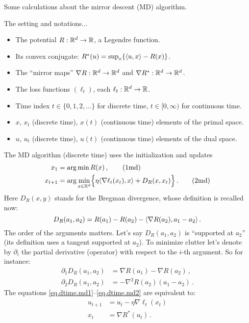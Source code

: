 \documentclass[12pt]{report}
\theoremstyle{plain}
\theoremstyle{definition}
\theoremstyle{remark}
\begin{document}

Some calculations about the mirror descent (MD) algorithm.

\bigskip

\noindent
The setting and notations...
\begin{itemize}[leftmargin=*, itemsep=2pt]
\item The potential $R : \mathbb{R}^d \to \mathbb{R}$, a Legendre function.
\item Its convex conjugate: $R^{*}(u) = \sup_{x} \{ \langle {u,x}\rangle - R(x)\}$.
\item The ``mirror maps'' $\nabla R : \mathbb{R}^d \to \mathbb{R}^d$ and $\nabla R^{*} : \mathbb{R}^d \to \mathbb{R}^d$.
\item The loss functions $(\ell_t)$, each $\ell_t : \mathbb{R}^d \to \mathbb{R}$.
\item Time index $t \in \{ 0,1,2,\ldots \}$ for discrete time, $t \in [0,\infty)$ for continuous time.
\item $x$, $x_t$ (discrete time), $x(t)$ (continuous time) elements of the primal space.
\item $u$, $u_t$ (discrete time), $u(t)$ (continuous time) elements of the dual space.
\end{itemize}
The MD algorithm (discrete time) uses the initialization and updates
\begin{align}
x_1 &= \arg\min R(x)\,, \label{eq.dtime.md1} \tag{1md} \\
x_{t+1} &= \arg\min_{x \in \mathbb{R}^d} \Bigl\{ \eta \langle {\nabla\ell_t(x_{t}), x}\rangle + D_{R}(x, x_{t})\Bigr\}\,.
 \label{eq.dtime.md2} 
\tag{2md}
\end{align}
Here $D_{R}(x,y)$ stands for the Bregman divergence, whose definition is recalled now:
\[
D_{R}(a_{1}, a_{2}) = R(a_{1}) - R(a_{2}) - \langle {\nabla R(a_2), a_{1} - a_{2}}\rangle\,.
\]
The order of the arguments matters.
Let's say $D_{R}(a_{1},a_{2})$ is ``supported at $a_{2}$''
(its definition uses a tangent supported at $a_{2}$).
To minimize clutter let's denote by $\partial_{i}$ the partial derivative (operator)
with respect to the $i$-th argument. So for instance:
\begin{align*}
\partial_{1} D_{R}(a_{1}, a_{2}) &= \nabla R(a_{1}) - \nabla R(a_{2})\,, \\[1mm]
\partial_{2} D_{R}(a_{1}, a_{2}) &= - \nabla^2 R(a_{2})(a_{1} - a_{2})\,.
\end{align*}
The equations \eqref{eq.dtime.md1}--\eqref{eq.dtime.md2} are equivalent to:
\begin{align*}
u_{t+1} &= u_{t} - \eta \nabla \ell_{t}(x_{t}) \label{eq.dtime.1} \tag{1dt} \\
x_{t} &= \nabla R^{*}(u_{t})\,. \label{eq.dtime.2} \tag{2dt}
\end{align*}
\end{document}

